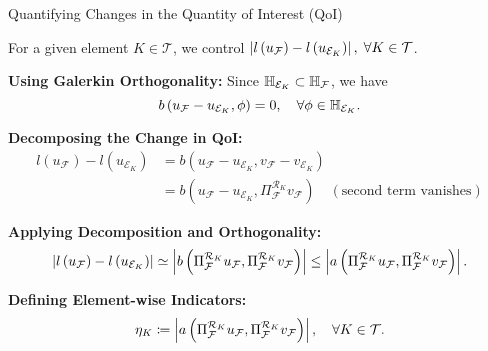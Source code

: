 \begin{frame}{Quantifying Changes in the Quantity of Interest (QoI)}

For a given element $K \in \mathcal{T}$, we control $\left|l\left(u_{\mathcal{F}}\right)-l\left(u_{\mathcal{E}_K}\right)\right|, \; \forall K \in \mathcal{T}$. 

\textbf{Using Galerkin Orthogonality:}
Since $\mathbb{H}_{\mathcal{E}_K} \subset \mathbb{H}_{\mathcal{F}}$, we have
\begin{equation}
  b\left(u_{\mathcal{F}}-u_{\mathcal{E}_K}, \phi\right)=0, \quad \forall \phi \in \mathbb{H}_{\mathcal{E}_K}.
\end{equation}

\textbf{Decomposing the Change in QoI:}
\begin{align}
  l\left(u_{\mathcal{F}}\right)-l\left(u_{\mathcal{E}_K}\right) & = b\left(u_{\mathcal{F}}-u_{\mathcal{E}_K},v_{\mathcal{F}}-v_{\mathcal{E}_K}\right) \\
  & = b\left(u_{\mathcal{F}}-u_{\mathcal{E}_K},\Pi_{\mathcal{F}}^{\mathcal{R}_K} v_{\mathcal{F}}\right) \quad (\text{second term vanishes})
\end{align}

\textbf{Applying Decomposition and Orthogonality:}
\begin{equation}
  \left|l\left(u_{\mathcal{F}}\right)-l\left(u_{\mathcal{E}_K}\right)\right| \simeq \left|b\left(\Pi_{\mathcal{F}}^{\mathcal{R}_K} u_{\mathcal{F}},\Pi_{\mathcal{F}}^{\mathcal{R}_K} v_{\mathcal{F}}\right)\right|
  \leq  \left|a\left(\Pi_{\mathcal{F}}^{\mathcal{R}_K} u_{\mathcal{F}},\Pi_{\mathcal{F}}^{\mathcal{R}_K} v_{\mathcal{F}}\right)\right|.
\end{equation}

\textbf{Defining Element-wise Indicators:}
\begin{equation}
  \eta_K \coloneqq \left|a\left(\Pi_{\mathcal{F}}^{\mathcal{R}_K} u_{\mathcal{F}},\Pi_{\mathcal{F}}^{\mathcal{R}_K} v_{\mathcal{F}}\right)\right|, \quad \forall K \in \mathcal{T}.
\end{equation}

\end{frame}

